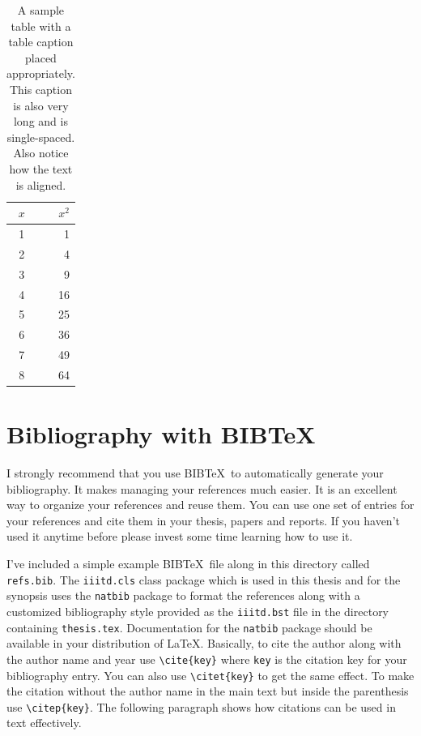 \documentclass[PhD]{iiitd}
\begin{document}
\begin{table}[htbp]
  \caption{A sample table with a table caption placed
    appropriately. This caption is also very long and is
    single-spaced.  Also notice how the text is aligned.}
  \begin{center}
  \begin{tabular}[c]{|c|r|} \hline
    $x$ & $x^2$ \\ \hline
    1  &  1   \\
    2  &  4  \\
    3  &  9  \\
    4  &  16  \\
    5  &  25  \\
    6  &  36  \\
    7  &  49  \\
    8  &  64  \\ \hline
  \end{tabular}
  \label{tab:sample}
  \end{center}
\end{table}

\section{Bibliography with BIB\TeX}

I strongly recommend that you use BIB\TeX\ to automatically generate
your bibliography.  It makes managing your references much easier.  It
is an excellent way to organize your references and reuse them.  You
can use one set of entries for your references and cite them in your
thesis, papers and reports.  If you haven't used it anytime before
please invest some time learning how to use it.  

I've included a simple example BIB\TeX\ file along in this directory
called \verb+refs.bib+.  The \verb+iiitd.cls+ class package which
is used in this thesis and for the synopsis uses the \verb+natbib+
package to format the references along with a customized bibliography
style provided as the \verb+iiitd.bst+ file in the directory containing
\verb+thesis.tex+.  Documentation for the \verb+natbib+ package should
be available in your distribution of \LaTeX.  Basically, to cite the
author along with the author name and year use \verb+\cite{key}+ where
\verb+key+ is the citation key for your bibliography entry.  You can
also use \verb+\citet{key}+ to get the same effect.  To make the
citation without the author name in the main text but inside the
parenthesis use \verb+\citep{key}+.  The following paragraph shows how
citations can be used in text effectively.
\end{document}
